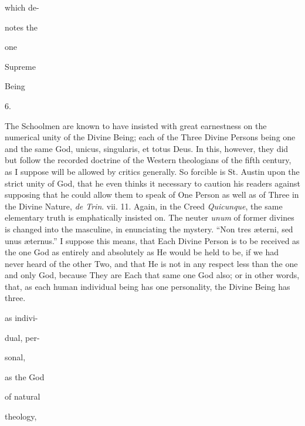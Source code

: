 which de-

notes the

one

Supreme

Being

6.

The Schoolmen are known to have insisted
with great earnestness on the numerical unity of the Divine
Being; each of the Three Divine Persons being one and the same
God, unicus, singularis, et totus Deus. In this, however, they
did but follow the recorded doctrine of the Western
theologians of the fifth century, as I suppose will be allowed
by critics generally. So forcible is St. Austin upon the
strict unity of God, that he even thinks it necessary to
caution his readers against supposing that he could allow them
to speak of One Person as well as of Three in the Divine
Nature, \emph{de Trin}. vii. 11. Again, in the Creed \emph{Quicunque},
the same elementary truth is emphatically insisted on. The
neuter \emph{unum} of former divines is changed into the
masculine, in enunciating the mystery. ``Non tres æterni, sed
unus æternus.'' I suppose this means, that Each Divine Person
is to be received as the one God as entirely and absolutely as
He would be held to be, if we had never heard of the
other Two, and that He is not in any respect less than the one
and only God, because They are Each that same one God also; or
in other words, that, as each human individual being has one
personality, the Divine Being has three.

as
indivi-

dual, per-

sonal,

as the God

of natural

theology,

